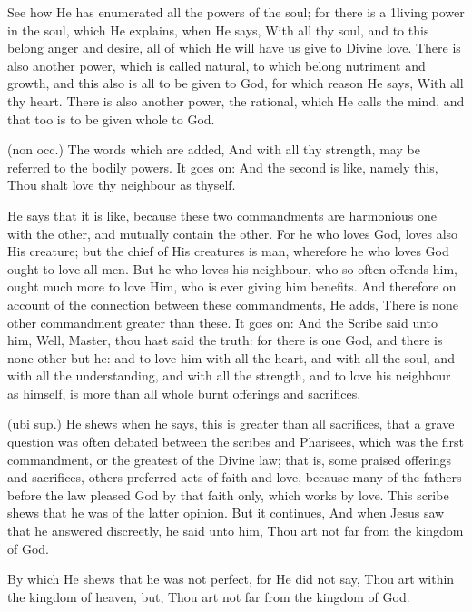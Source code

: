 See how He has enumerated all the powers of the soul; for there is a 1living power in the soul, which He explains, when He says, With all thy soul, and to this belong anger and desire, all of which He will have us give to Divine love. There is also another power, which is called natural, to which belong nutriment and growth, and this also is all to be given to God, for which reason He says, With all thy heart. There is also another power, the rational, which He calls the mind, and that too is to be given whole to God.

 (non occ.) The words which are added, And with all thy strength, may be referred to the bodily powers. It goes on: And the second is like, namely this, Thou shalt love thy neighbour as thyself.

 He says that it is like, because these two commandments are harmonious one with the other, and mutually contain the other. For he who loves God, loves also His creature; but the chief of His creatures is man, wherefore he who loves God ought to love all men. But he who loves his neighbour, who so often offends him, ought much more to love Him, who is ever giving him benefits. And therefore on account of the connection between these commandments, He adds, There is none other commandment greater than these. It goes on: And the Scribe said unto him, Well, Master, thou hast said the truth: for there is one God, and there is none other but he: and to love him with all the heart, and with all the soul, and with all the understanding, and with all the strength, and to love his neighbour as himself, is more than all whole burnt offerings and sacrifices.

 (ubi sup.) He shews when he says, this is greater than all sacrifices, that a grave question was often debated between the scribes and Pharisees, which was the first commandment, or the greatest of the Divine law; that is, some praised offerings and sacrifices, others preferred acts of faith and love, because many of the fathers before the law pleased God by that faith only, which works by love. This scribe shews that he was of the latter opinion. But it continues, And when Jesus saw that he answered discreetly, he said unto him, Thou art not far from the kingdom of God.

 By which He shews that he was not perfect, for He did not say, Thou art within the kingdom of heaven, but, Thou art not far from the kingdom of God.

